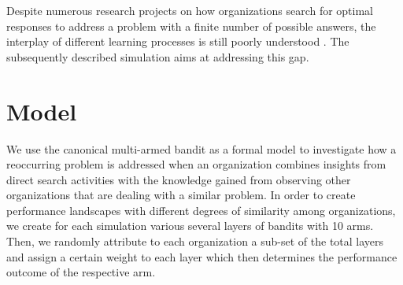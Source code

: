 
Despite numerous research projects on how organizations search for optimal responses to address a problem with a finite number of possible answers, the interplay of different learning processes is still poorly understood \citep{BinghamDavis2012_Learning-Sequences-Their-Existence-Effect-and-Evolution_AMJ}. The subsequently described simulation aims at addressing this gap.




\section*{Model}

We use the canonical multi-armed bandit \citep{DenrellMarch2001_Adaptation-as-Information-Restriction-The-Hot-Stove_OS, March1991_Exploration-and-Exploitation_OS} as a formal model to investigate how a reoccurring problem is addressed when an organization combines insights from direct search activities with the knowledge gained from observing other organizations that are dealing with a similar problem. 
In order to create performance landscapes with different degrees of similarity among organizations, we create for each simulation various several layers of bandits with 10 arms. Then, we randomly attribute to each organization a sub-set of the total layers and assign a certain weight to each layer which then determines the performance outcome of the respective arm. 

